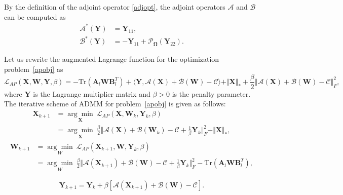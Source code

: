 \documentclass{article}
\begin{document}
{By the definition of the adjoint operator \eqref{adjopt}, the adjoint operators  $\mathcal{A}$ and $\mathcal{B}$ can be computed as 
\begin{equation}
    \begin{aligned}
        \mathcal{A}^*(\mathbf Y) & = \mathbf Y_{11}, \\
        \mathcal{B}^*(\mathbf Y) & = -\mathbf Y_{11} + \mathcal{P}_{\mathbf\Omega}(\mathbf Y_{22}).
    \end{aligned}\label{optab}
\end{equation}

Let us rewrite the augmented Lagrange function for the optimization problem~\eqref{apobj} as 
\begin{equation}
\mathcal{L}_{AP}(\mathbf X,\mathbf W,\mathbf Y,\beta) = -\text{Tr}(\mathbf A_l\mathbf W\mathbf B_l^T) + \langle\mathbf Y, \mathcal{A}(\mathbf X)+\mathcal{B}(\mathbf W) -\mathcal{C} \rangle + \Vert\mathbf X \Vert_* + \frac{\beta}{2}\Vert \mathcal{A}(\mathbf X)+\mathcal{B}(\mathbf W) -\mathcal{C} \Vert^2_F,
\end{equation}
where $\mathbf Y$ is the Lagrange multiplier matrix and $\beta >0$ is the penalty parameter. The iterative scheme of ADMM for problem~\eqref{apobj} is given as follows:
    \begin{align}
        \mathbf X_{k+1} & = \underset{\mathbf X}{\arg\min}\  \mathcal{L}_{AP}(\mathbf X, \mathbf W_k,\mathbf Y_k,\beta) \nonumber\\
        & = \underset{\mathbf X}{\arg\min}\ \frac{\beta}{2}\Vert \mathcal{A}(\mathbf X) + \mathcal{B}(\mathbf W_k) - \mathcal{C} + \frac{1}{\beta}\mathbf Y_{k} \Vert_F^2 + \Vert\mathbf X \Vert_*,
        \label{apx}
    \end{align}
    \begin{align}
        \mathbf W_{k+1} & = \underset{W}{\arg\min}\  \mathcal{L}_{AP}(\mathbf X_{k+1},\mathbf W,\mathbf Y_k,\beta)  \nonumber \\
        & = \underset{W}{\arg\min}\ \frac{\beta}{2}\Vert \mathcal{A}(\mathbf X_{k+1}) + \mathcal{B}(\mathbf W) - \mathcal{C} + \frac{1}{\beta}\mathbf Y_{k} \Vert_F^2 -\text{Tr}(\mathbf A_l\mathbf W\mathbf B_l^T),
        \label{apw}
    \end{align}

\begin{equation}
    \mathbf Y_{k+1} = \mathbf Y_{k}+\beta[\mathcal{A}(\mathbf X_{k+1})+\mathcal{B}(\mathbf W)-\mathcal{C}].
    \label{apy}
\end{equation}

}
\end{document}
